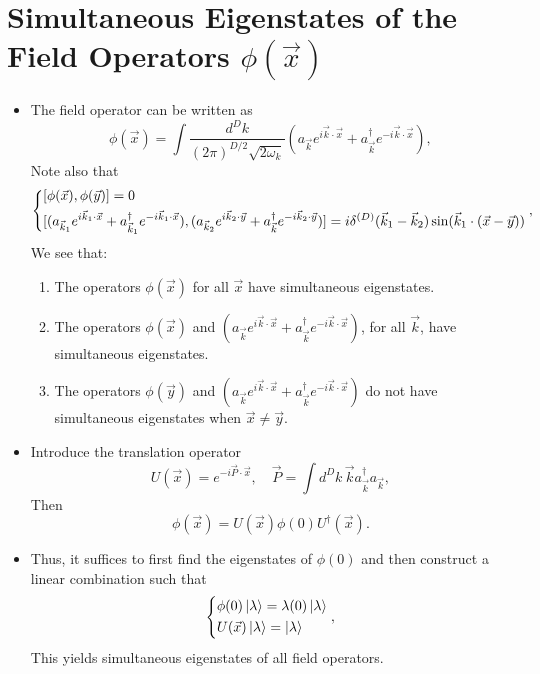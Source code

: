 \documentclass[10pt, a4paper]{article}
\numberwithin{equation}{section}
\begin{document}
	\section{Simultaneous Eigenstates of the Field Operators \texorpdfstring{$\phi(\vec{x})$}{phi(x)}}
	\begin{itemize}
		\item The field operator can be written as
		\begin{equation}
			\phi(\vec{x}) = \int \frac{d^D k}{(2 \pi)^{D / 2} \sqrt{2 \omega_k}} (a_{\vec{k}} e^{i \vec{k} \cdot \vec{x}} + a^\dag_{\vec{k}} e^{- i \vec{k} \cdot \vec{x}}),
		\end{equation}
		Note also that
		\begin{equation}
			\begin{dcases}
				[\phi(\vec{x}), \phi(\vec{y})] = 0 \\
				[(a_{\vec{k}_1} e^{i \vec{k}_1 \cdot \vec{x}} + a^\dag_{\vec{k}_1} e^{- i \vec{k}_1 \cdot \vec{x}}), (a_{\vec{k}_2} e^{i \vec{k}_2 \cdot \vec{y}} + a^\dag_{\vec{k}} e^{- i \vec{k}_2 \cdot \vec{y}})] = i \delta^{(D)}(\vec{k}_1 - \vec{k}_2) \sin(\vec{k}_1 \cdot (\vec{x} - \vec{y}))
			\end{dcases},
		\end{equation}
		We see that:
		\begin{enumerate}
			\item The operators $\phi(\vec{x})$ for all $\vec{x}$ have simultaneous eigenstates.
			
			\item The operators $\phi(\vec{x})$ and $(a_{\vec{k}} e^{i \vec{k} \cdot \vec{x}} + a^\dag_{\vec{k}} e^{- i \vec{k} \cdot \vec{x}})$, for all $\vec{k}$, have simultaneous eigenstates.
			
			\item The operators $\phi(\vec{y})$ and $(a_{\vec{k}} e^{i \vec{k} \cdot \vec{x}} + a^\dag_{\vec{k}} e^{- i \vec{k} \cdot \vec{x}})$ do not have simultaneous eigenstates when $\vec{x} \neq \vec{y}$.
		\end{enumerate}
		
		\item Introduce the translation operator
		\begin{equation}
			U(\vec{x}) = e^{- i \vec{P} \cdot \vec{x}}, \quad \vec{P} = \int d^D k \, \vec{k} a^\dag_{\vec{k}} a_{\vec{k}},
		\end{equation}
		Then
		\begin{equation}
			\phi(\vec{x}) = U(\vec{x}) \phi(0) U^\dag(\vec{x}).
		\end{equation}
		
		\item Thus, it suffices to first find the eigenstates of $\phi(0)$ and then construct a linear combination such that
		\begin{equation}
			\begin{dcases}
				\phi(0) \ket{\lambda} = \lambda(0) \ket{\lambda} \\
				U(\vec{x}) \ket{\lambda} = \ket{\lambda}
			\end{dcases},
		\end{equation}
		This yields simultaneous eigenstates of all field operators.
	\end{itemize}
	
\end{document}
